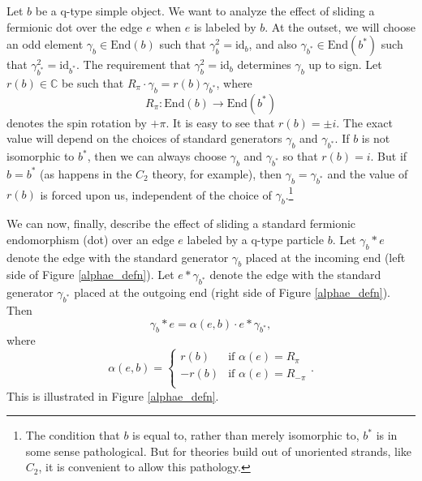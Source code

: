 \documentclass[12pt,a4paper]{article}
\newcommand{\cc}{\mathbb{C}}
\newcommand\be            {\begin{equation}}
\newcommand\ee            {\end{equation}}
\newcommand{\id}{\text{id}}
\newcommand{\End}{\text{End}}
\newcommand{\kw}[1]{{\color{kwcolor}\footnotesize{(KW) #1}}}
\begin{document}
Let $b$ be a q-type simple object.
We want to analyze the effect of sliding a fermionic dot over the edge $e$ when $e$ is labeled by $b$.
At the outset, we will choose an odd element $\gamma_b\in\End(b)$ such that $\gamma_b^2 = \id_b$, and also
$\gamma_{b^*}\in\End(b^*)$ such that $\gamma_{b^*}^2 = \id_{b^*}$.
The requirement that $\gamma_b^2 = \id_b$ determines $\gamma_b$ up to sign.
Let $r(b)\in\cc$ be such that $R_\pi\cdot\gamma_b = r(b)\gamma_{b^*}$, where
\be
	R_\pi : \End(b) \to \End(b^*)
\ee
denotes the spin rotation by $+\pi$.
It is easy to see that $r(b) = \pm i$.
The exact value will depend on the choices of standard generators $\gamma_b$ and $\gamma_{b^*}$.
If $b$ is not isomorphic to $b^*$, then we can always choose $\gamma_b$ and $\gamma_{b^*}$ so that $r(b) = i$.
But if $b = b^*$ (as happens in the $C_2$ theory, for example), then $\gamma_b = \gamma_{b^*}$ and the value of $r(b)$
is forced upon us, independent of the choice of $\gamma_b$.\footnote{
The condition that $b$ is equal to, rather than merely isomorphic to, $b^*$ is in some sense pathological.
But for theories build out of unoriented strands, like $C_2$, it is convenient to allow this pathology.}

We can now, finally, describe the effect of sliding a standard fermionic endomorphism (dot) over an edge $e$ labeled by 
a q-type particle $b$.
Let $\gamma_b * e$ denote the edge with the standard generator $\gamma_b$ placed at the incoming end (left side of Figure \ref{alphae_defn}).
Let $e* \gamma_{b^*}$ denote the edge with the standard generator $\gamma_{b^*}$ placed at the outgoing end (right side of Figure \ref{alphae_defn}).
Then
\be
	\gamma_b * e = \alpha(e, b) \cdot e* \gamma_{b^*} ,
\ee
where
\be
	\alpha(e, b) =  \left\{   \begin{array}{ll}  
		r(b) & \mbox{if $\alpha(e) = R_\pi$} \\
		-r(b) & \mbox{if $\alpha(e) = R_{-\pi}$} \\
	\end{array}  \right. .
\ee
This is illustrated in Figure \ref{alphae_defn}.

\end{document}

